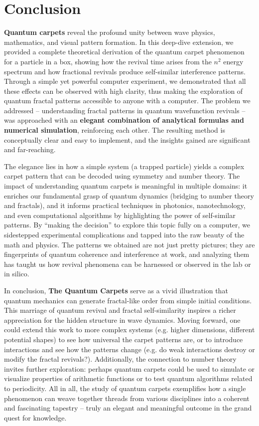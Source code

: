 \documentclass[11pt,a4paper]{article}
\begin{document}
\section{Conclusion}

\textbf{Quantum carpets} reveal the profound unity between wave physics, mathematics, and visual pattern formation. In this deep-dive extension, we provided a complete theoretical derivation of the quantum carpet phenomenon for a particle in a box, showing how the revival time arises from the $n^2$ energy spectrum and how fractional revivals produce self-similar interference patterns. Through a simple yet powerful computer experiment, we demonstrated that all these effects can be observed with high clarity, thus making the exploration of quantum fractal patterns accessible to anyone with a computer. The problem we addressed – understanding fractal patterns in quantum wavefunction revivals – was approached with an \textbf{elegant combination of analytical formulas and numerical simulation}, reinforcing each other. The resulting method is conceptually clear and easy to implement, and the insights gained are significant and far-reaching.

The elegance lies in how a simple system (a trapped particle) yields a complex carpet pattern that can be decoded using symmetry and number theory. The impact of understanding quantum carpets is meaningful in multiple domains: it enriches our fundamental grasp of quantum dynamics (bridging to number theory and fractals), and it informs practical techniques in photonics, nanotechnology, and even computational algorithms by highlighting the power of self-similar patterns. By “making the decision” to explore this topic fully on a computer, we sidestepped experimental complications and tapped into the raw beauty of the math and physics. The patterns we obtained are not just pretty pictures; they are fingerprints of quantum coherence and interference at work, and analyzing them has taught us how revival phenomena can be harnessed or observed in the lab or in silico.

In conclusion, \textbf{The Quantum Carpets} serve as a vivid illustration that quantum mechanics can generate fractal-like order from simple initial conditions. This marriage of quantum revival and fractal self-similarity inspires a richer appreciation for the hidden structure in wave dynamics. Moving forward, one could extend this work to more complex systems (e.g. higher dimensions, different potential shapes) to see how universal the carpet patterns are, or to introduce interactions and see how the patterns change (e.g. do weak interactions destroy or modify the fractal revivals?). Additionally, the connection to number theory invites further exploration: perhaps quantum carpets could be used to simulate or visualize properties of arithmetic functions or to test quantum algorithms related to periodicity. All in all, the study of quantum carpets exemplifies how a single phenomenon can weave together threads from various disciplines into a coherent and fascinating tapestry – truly an elegant and meaningful outcome in the grand quest for knowledge.
\end{document}
